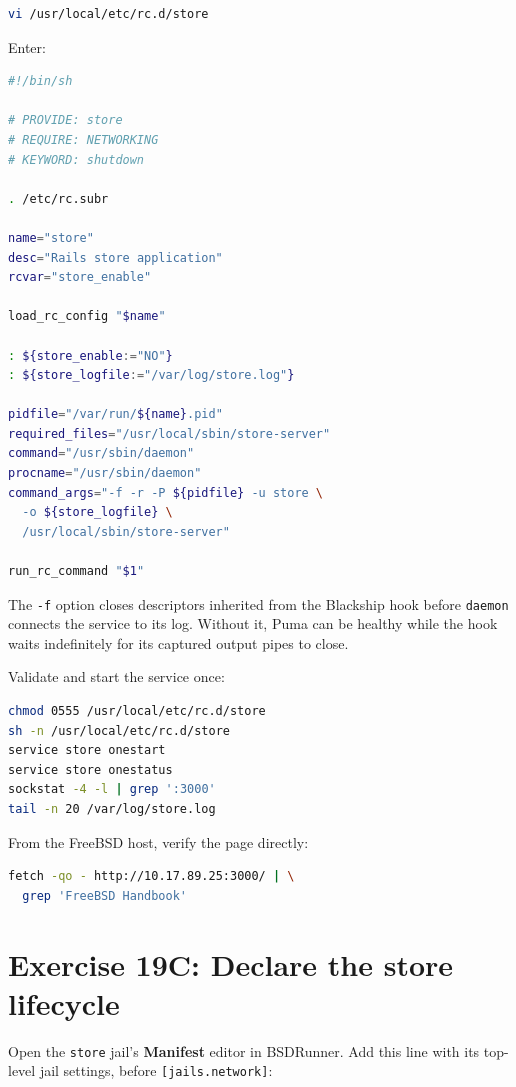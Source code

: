 \begin{lstlisting}[language=sh]
vi /usr/local/etc/rc.d/store
\end{lstlisting}

Enter:

\begin{lstlisting}[language=sh]
#!/bin/sh

# PROVIDE: store
# REQUIRE: NETWORKING
# KEYWORD: shutdown

. /etc/rc.subr

name="store"
desc="Rails store application"
rcvar="store_enable"

load_rc_config "$name"

: ${store_enable:="NO"}
: ${store_logfile:="/var/log/store.log"}

pidfile="/var/run/${name}.pid"
required_files="/usr/local/sbin/store-server"
command="/usr/sbin/daemon"
procname="/usr/sbin/daemon"
command_args="-f -r -P ${pidfile} -u store \
  -o ${store_logfile} \
  /usr/local/sbin/store-server"

run_rc_command "$1"
\end{lstlisting}

The \texttt{-f} option closes descriptors inherited from the Blackship hook
before \texttt{daemon} connects the service to its log. Without it, Puma can be
healthy while the hook waits indefinitely for its captured output pipes to
close.

Validate and start the service once:

\begin{lstlisting}[language=sh]
chmod 0555 /usr/local/etc/rc.d/store
sh -n /usr/local/etc/rc.d/store
service store onestart
service store onestatus
sockstat -4 -l | grep ':3000'
tail -n 20 /var/log/store.log
\end{lstlisting}

From the FreeBSD host, verify the page directly:

\begin{lstlisting}[language=sh]
fetch -qo - http://10.17.89.25:3000/ | \
  grep 'FreeBSD Handbook'
\end{lstlisting}

\section{Exercise 19C: Declare the store lifecycle}

Open the \texttt{store} jail's \textbf{Manifest} editor in BSDRunner. Add this
line with its top-level jail settings, before \texttt{[jails.network]}:


